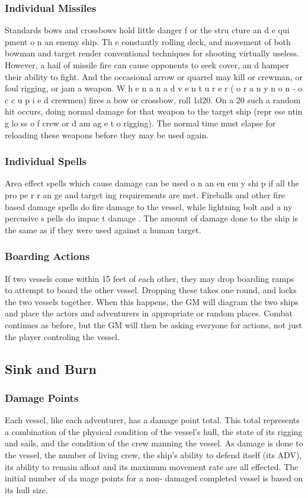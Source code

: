 \begin{multicols*}{2}
\subsubsection{Individual Missiles}
Standards bows and crossbows hold little danger
f or the stru cture an d e qui pment o n an enemy ship. Th e
constantly rolling deck, and movement of both bowman and
target render conventional techniques for shooting virtually
useless. However, a hail of missile fire can cause opponents
to seek cover, an d hamper their ability to fight. And the
occasional arrow or quarrel may kill or crewman, or foul
rigging, or jam a weapon.
W h e n a n a d v e n t u r e r ( o r a n y n o n - o c c u p i e d
crewmen) fires a bow or crossbow, roll 1d20. On a 20 such a
random hit occurs, doing normal damage for that weapon to
the target ship (repr ese ntin g lo ss o f crew or d am ag e t o
rigging). The normal time must elapse for reloading these
weapons before they may be used again.
\subsubsection{Individual Spells}
Area effect spells which cause damage can be used
o n an en em y shi p if all the pro pe r r an ge and target ing
requirements are met. Fireballs and other fire based damage
spells do fire damage to the vessel, while lightning bolt and
a ny percusive s pells do impac t damage . The amount of
damage done to the ship is the same as if they were used
against a human target.
\subsubsection{Boarding Actions}
If two vessels come within 15 feet of each other,
they may drop boarding ramps to attempt to board the other
vessel. Dropping these takes one round, and locks the two
vessels together. When this happens, the GM will diagram the
two ships and place the actors and adventurers in appropriate
or random places. Combat continues as before, but the GM
will then be asking everyone for actions, not just the player
controling the vessel.
\subsection{Sink and Burn}
\subsubsection{Damage Points}
Each vessel, like each adventurer, has a damage
point total. This total represents a combination of the physical
condition of the vessel’s hull, the state of its rigging and sails,
and the condition of the crew manning the vessel. As damage
is done to the vessel, the number of living crew, the ship’s
ability to defend itself (its ADV), its ability to remain afloat
and its maximum movement rate are all effected.
The initial number of da mage points for a non-
damaged completed vessel is based on its hull size.


\end{multicols*}
